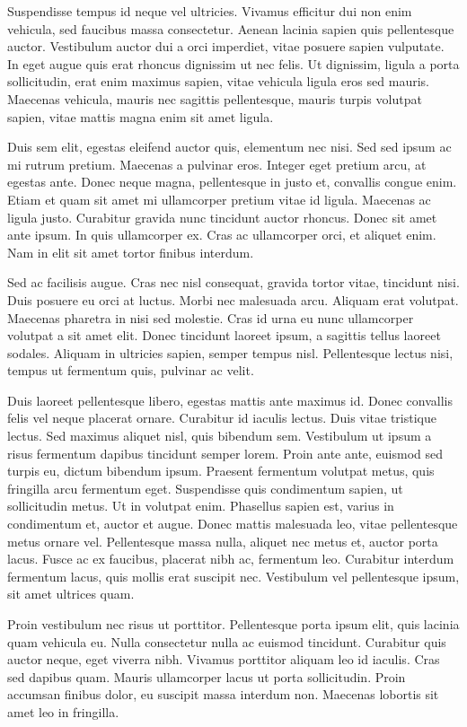 Suspendisse tempus id neque vel ultricies. Vivamus efficitur dui non enim vehicula, sed faucibus massa consectetur. Aenean lacinia sapien quis pellentesque auctor. Vestibulum auctor dui a orci imperdiet, vitae posuere sapien vulputate. In eget augue quis erat rhoncus dignissim ut nec felis. Ut dignissim, ligula a porta sollicitudin, erat enim maximus sapien, vitae vehicula ligula eros sed mauris. Maecenas vehicula, mauris nec sagittis pellentesque, mauris turpis volutpat sapien, vitae mattis magna enim sit amet ligula.

Duis sem elit, egestas eleifend auctor quis, elementum nec nisi. Sed sed ipsum ac mi rutrum pretium. Maecenas a pulvinar eros. Integer eget pretium arcu, at egestas ante. Donec neque magna, pellentesque in justo et, convallis congue enim. Etiam et quam sit amet mi ullamcorper pretium vitae id ligula. Maecenas ac ligula justo. Curabitur gravida nunc tincidunt auctor rhoncus. Donec sit amet ante ipsum. In quis ullamcorper ex. Cras ac ullamcorper orci, et aliquet enim. Nam in elit sit amet tortor finibus interdum.

Sed ac facilisis augue. Cras nec nisl consequat, gravida tortor vitae, tincidunt nisi. Duis posuere eu orci at luctus. Morbi nec malesuada arcu. Aliquam erat volutpat. Maecenas pharetra in nisi sed molestie. Cras id urna eu nunc ullamcorper volutpat a sit amet elit. Donec tincidunt laoreet ipsum, a sagittis tellus laoreet sodales. Aliquam in ultricies sapien, semper tempus nisl. Pellentesque lectus nisi, tempus ut fermentum quis, pulvinar ac velit.

Duis laoreet pellentesque libero, egestas mattis ante maximus id. Donec convallis felis vel neque placerat ornare. Curabitur id iaculis lectus. Duis vitae tristique lectus. Sed maximus aliquet nisl, quis bibendum sem. Vestibulum ut ipsum a risus fermentum dapibus tincidunt semper lorem. Proin ante ante, euismod sed turpis eu, dictum bibendum ipsum. Praesent fermentum volutpat metus, quis fringilla arcu fermentum eget. Suspendisse quis condimentum sapien, ut sollicitudin metus. Ut in volutpat enim. Phasellus sapien est, varius in condimentum et, auctor et augue. Donec mattis malesuada leo, vitae pellentesque metus ornare vel. Pellentesque massa nulla, aliquet nec metus et, auctor porta lacus. Fusce ac ex faucibus, placerat nibh ac, fermentum leo. Curabitur interdum fermentum lacus, quis mollis erat suscipit nec. Vestibulum vel pellentesque ipsum, sit amet ultrices quam.

Proin vestibulum nec risus ut porttitor. Pellentesque porta ipsum elit, quis lacinia quam vehicula eu. Nulla consectetur nulla ac euismod tincidunt. Curabitur quis auctor neque, eget viverra nibh. Vivamus porttitor aliquam leo id iaculis. Cras sed dapibus quam. Mauris ullamcorper lacus ut porta sollicitudin. Proin accumsan finibus dolor, eu suscipit massa interdum non. Maecenas lobortis sit amet leo in fringilla.

